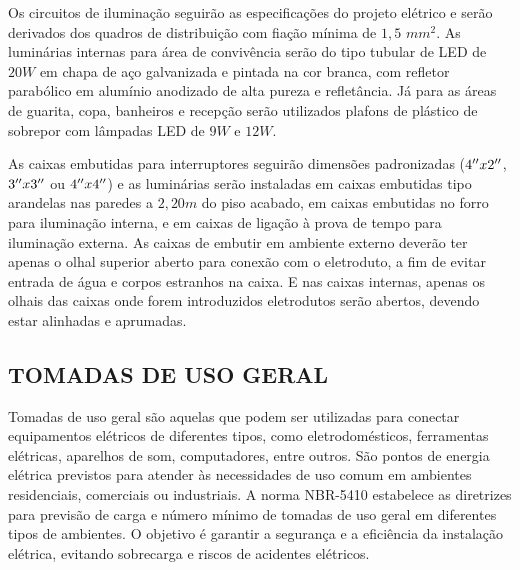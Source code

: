 Os circuitos de iluminação seguirão as especificações do projeto elétrico e serão derivados dos quadros de distribuição com fiação mínima de $1,5$ $mm^2$. As luminárias internas para área de convivência serão do tipo tubular de LED de $20W$ em chapa de aço galvanizada e pintada na cor branca, com refletor parabólico em alumínio anodizado de alta pureza e refletância. Já para as áreas de guarita, copa, banheiros e recepção serão utilizados plafons de plástico de sobrepor com lâmpadas LED de $9W$ e $12W$.

As caixas embutidas para interruptores seguirão dimensões padronizadas ($4{}^{\prime\prime} x 2 {}^{\prime\prime}$, $3 {}^{\prime\prime} x 3 {}^{\prime\prime}$ ou $4 {}^{\prime\prime} x 4 {}^{\prime\prime}$) e as luminárias serão instaladas em caixas embutidas tipo arandelas nas paredes a $2,20m$ do piso acabado, em caixas embutidas no forro para iluminação interna, e em caixas de ligação à prova de tempo para iluminação externa. As caixas de embutir em ambiente externo deverão ter apenas o olhal superior aberto para conexão com o eletroduto, a fim de evitar entrada de água e corpos estranhos na caixa. E nas caixas internas, apenas os olhais das caixas onde forem introduzidos eletrodutos serão abertos, devendo estar alinhadas e aprumadas.

\subsection{TOMADAS DE USO GERAL}


Tomadas de uso geral são aquelas que podem ser utilizadas para conectar equipamentos elétricos de diferentes tipos, como eletrodomésticos, ferramentas elétricas, aparelhos de som, computadores, entre outros. São pontos de energia elétrica previstos para atender às necessidades de uso comum em ambientes residenciais, comerciais ou industriais. A norma NBR-5410 estabelece as diretrizes para previsão de carga e número mínimo de tomadas de uso geral em diferentes tipos de ambientes. O objetivo é garantir a segurança e a eficiência da instalação elétrica, evitando sobrecarga e riscos de acidentes elétricos.


